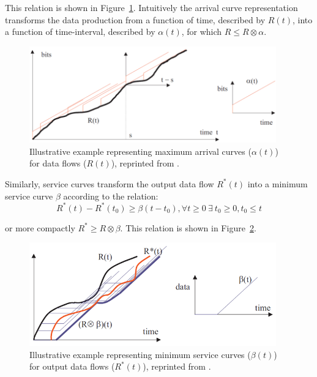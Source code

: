 This relation is shown in Figure~\ref{fig:nc_arrival_curve}.
Intuitively the arrival curve representation transforms the data
production from a function of time, described by $R(t)$, into a
function of time-interval, described by $\alpha(t)$, for which $R\leq
R \otimes \alpha$.

\begin{figure}[htb]
  \centering
  \includegraphics[width=0.95\textwidth]{figs/nc_arrival_curve.png}
  \caption{Illustrative example representing maximum arrival curves
    ($\alpha(t)$) for data flows ($R(t)$), reprinted from
    \cite{NCBook}.}
  \label{fig:nc_arrival_curve}
\end{figure}

Similarly, service curves transform the output data flow $R^*(t)$
into a minimum service curve $\beta$ according to the relation:
\begin{equation}
  R^*(t)-R^*(t_0)\geq \beta(t-t_0), \forall t\geq 0\ \exists\ t_0\geq
  0,t_0\leq t
\end{equation}

or more compactly $R^*\geq R\otimes\beta$.  This relation is shown in
Figure~\ref{fig:nc_service_curve}.

\begin{figure}[htb]
  \centering
  \includegraphics[width=0.95\textwidth]{figs/nc_service_curve.png}
  \caption{Illustrative example representing minimum service curves
    ($\beta(t)$) for output data flows ($R^*(t)$), reprinted from
    \cite{NCBook}.}
  \label{fig:nc_service_curve}
\end{figure}


